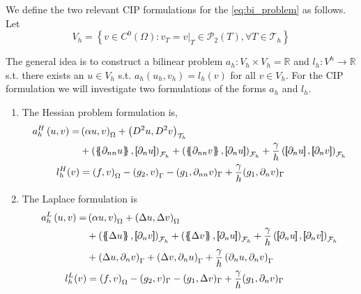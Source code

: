 We define the two relevant CIP formulations for the \eqref{eq:bi_problem} as follows. Let $$V_{h} = \left\{ v \in C^{0}\left( \Omega  \right): v_{T} = v | _{T} \in \mathcal{P} _{2}\left( T \right), \forall T \in
\mathcal{T}_{h}    \right\}$$

The general idea is to construct a bilinear problem $a_{h}: V_{h} \times  V_{h} = \mathbb{R} $ and $l_{h}: V^{h} \to \mathbb{R} $ s.t. there exists an $u \in V_{h}$ s.t. $a_{h}( u_{h}, v_{h}) = l_{h}( v) $ for all $v \in V_{h}$. For the CIP
formulation we will investigate two formulations of the forms $a_{h}$ and $l_{h}$.

\begin{enumerate}[label=\arabic*)]
    \item The Hessian problem formulation is,
\begin{equation}
    \label{eq:cip_biharmonic_form}
\begin{split}
a_{h}^{H} \left( u, v \right)   =&
    \left( \alpha  u, v \right) _{\Omega }   +  \left( D^2 u, D^2v \right) _{\mathcal{T} _{h}} \\
 & +
  \left( \mean{  \partial _{n n} u }, \jump{ \partial _{n }u} \right)_{\mathcal{F}_{h}}  +
 \left( \mean{ \partial _{n n} v }, \jump{ \partial _{n}u }      \right)_{\mathcal{F}_{h}}  + \frac{\gamma }{h}  \left( \jump{ \partial _{n} u}, \jump{ \partial _{n} v   }   \right)_{\mathcal{F}_{h}} \\
 l_{h}^{H}( v) & =  \left( f, v \right) _{\Omega }  - \left(g_{2}, v  \right) _{\Gamma } - ( g_{1}, \partial _{nn} v)_{\Gamma } +  \frac{\gamma }{h} ( g_{1} , \partial _{n} v)_{\Gamma }
\end{split}
\end{equation}

\item The Laplace formulation is
    \begin{equation}
        \label{eq:cip_laplace_form}
        \begin{split}
            a_{h}^{L} \left( u, v \right)   =&
            \left( \alpha  u, v \right) _{\Omega }   +  \left( \Delta  u, \Delta v \right) _{ \Omega } \\
                                             & + \left( \mean{  \Delta  u }, \jump{ \partial _{n }v} \right)_{\mathcal{F}_{h}  }  + \left( \mean{ \Delta  v }, \jump{ \partial _{n}u }      \right)_{\mathcal{F}_{h}  }  + \frac{\gamma }{h}  \left( \jump{ \partial _{n} u}, \jump{ \partial _{n} v   }   \right)_{\mathcal{F}_{h} } \\
                                             & + \left(   \Delta  u ,  \partial _{n }v \right)_{\Gamma   }  + \left(  \Delta  v ,  \partial _{n}u       \right)_{\Gamma  }  + \frac{\gamma }{h}  \left(  \partial _{n} u,  \partial _{n} v      \right)_{ \Gamma } \\
                                             l^{L}_{h}( v) & =  \left( f, v \right) _{\Omega } - ( g_{2},  v )_{\Gamma } -  ( g_{1}, \Delta  v  )_{\Gamma }  + \frac{\gamma }{h} ( g_{1}, \partial _{n} v  )_{\Gamma }
                                         \end{split}
                                     \end{equation}


\end{enumerate}
